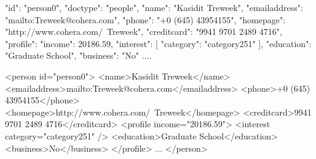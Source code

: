  
 \label{code:nosql-person0}
\begin{fakeJSON}[label=json,caption=General NoSQL data representation of XMARk data]
	{
		"id": "person0",
		"doctype": "people",
		"name": "Kasidit Treweek",
		"emailaddress": "mailto:Treweek@cohera.com",
		"phone": "+0 (645) 43954155",
		"homepage": "http://www.cohera.com/~Treweek",
		"creditcard": "9941 9701 2489 4716",
		"profile": {
			"income": 20186.59,
			"interest": [{
				"category": "category251"
			}],
			"education": "Graduate School",
			"business": "No"
		}
		....
	}
\end{fakeJSON} 

\begin{fakeXML}[label=xml,caption=XMARK data with of \textit{person0}]
	
	<person id="person0">
	<name>Kasidit Treweek</name>
	<emailaddress>mailto:Treweek@cohera.com</emailaddress>
	<phone>+0 (645) 43954155</phone>
	<homepage>http://www.cohera.com/~Treweek</homepage>
	<creditcard>9941 9701 2489 4716</creditcard>
	<profile income="20186.59">
	<interest category="category251" />
	<education>Graduate School</education>
	<business>No</business>
	</profile>
	...
	</person>
\end{fakeXML} 

\iffalse
\begin{minipage}{.5\textwidth}
	\begin{tikzpicture}[%
	grow via three points={one child at (0.5,-0.7) and
		two children at (0.5,-0.7) and (0.5,-1.4)},
	edge from parent path={(\tikzparentnode.south) |- (\tikzchildnode.west)}]
	\node {\{asfdasfd\}}
	child { node [defi] {\textit{Schema\_ID}}}
	child { node [json] {xs:attribute}
		child { node [defi] {\textit{Attribute\_ID}}}
		child { node [attribute] {@name}}
		child { node [attribute] {@type}}
		child { node [attribute] {@fixed}}
		child { node [attribute] {@default}}
	};
	\end{tikzpicture}
\end{minipage}

\fi